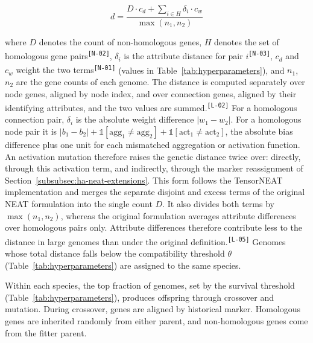 \documentclass[12pt]{article}
\newcommand{\revID}[1]{\textsuperscript{\scriptsize\texttt{[#1]}}}
\newcommand{\revClarity}[2]{\textcolor{lrOrange}{#2}\revID{#1}} %
\newcommand{\revNota}[2]{\textcolor{lrViolet}{#2}\revID{#1}}    %
\begin{document}
\[d = \frac{D \cdot c_d + \sum_{i \in H} \delta_i \cdot c_w}{\max(n_1, n_2)}\]

where $D$ denotes the count of non-homologous genes, \revNota{N-02}{$H$ denotes the set of homologous gene pairs}, \revNota{N-03}{$\delta_i$ is the attribute distance for pair $i$}, \revNota{N-01}{$c_d$ and $c_w$ weight the two terms} (values in Table~\ref{tab:hyperparameters}), and $n_1$, $n_2$ are the gene counts of each genome.
\revClarity{L-02}{The distance is computed separately over node genes, aligned by node index, and over connection genes, aligned by their identifying attributes, and the two values are summed.}
For a homologous connection pair, $\delta_i$ is the absolute weight difference $|w_1 - w_2|$.
For a homologous node pair it is $|b_1 - b_2| + \mathbb{1}[\text{agg}_1 \neq \text{agg}_2] + \mathbb{1}[\text{act}_1 \neq \text{act}_2]$, the absolute bias difference plus one unit for each mismatched aggregation or activation function.
An activation mutation therefore raises the genetic distance twice over: directly, through this activation term, and indirectly, through the marker reassignment of Section~\ref{subsubsec:ha-neat-extensions}.
This form follows the TensorNEAT \parencite{wang_tensorized_2024} implementation and merges the separate disjoint and excess terms of the original NEAT formulation into the single count $D$.
It also divides both terms by $\max(n_1, n_2)$, whereas the original formulation averages attribute differences over homologous pairs only. \revClarity{L-05}{Attribute differences therefore contribute less to the distance in large genomes than under the original definition.}
Genomes whose total distance falls below the compatibility threshold $\theta$ (Table~\ref{tab:hyperparameters}) are assigned to the same species.

Within each species, the top fraction of genomes, set by the survival threshold (Table~\ref{tab:hyperparameters}), produces offspring through crossover and mutation.
During crossover, genes are aligned by historical marker. Homologous genes are inherited randomly from either parent, and non-homologous genes come from the fitter parent.

\end{document}
